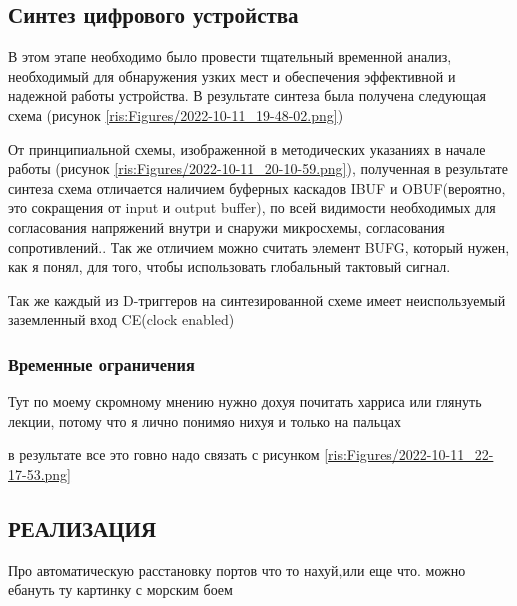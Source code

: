\begin{sloppypar}
\subsection{Синтез цифрового устройства} %
В этом этапе необходимо было провести тщательный временной анализ, необходимый для обнаружения узких мест и обеспечения эффективной и надежной работы устройства. 
В результате синтеза была получена следующая схема (рисунок \ref{ris:Figures/2022-10-11_19-48-02.png})


От принципиальной схемы, изображенной в методических указаниях в начале работы (рисунок \ref{ris:Figures/2022-10-11_20-10-59.png}), полученная в результате синтеза схема отличается наличием буферных каскадов IBUF и OBUF(вероятно, это сокращения от input и output buffer), по всей видимости необходимых для согласования напряжений внутри и снаружи микросхемы, согласования сопротивлений.. Так же отличием можно считать элемент BUFG, который нужен, как я понял, для того, чтобы использовать глобальный тактовый сигнал. 

Так же каждый из D-триггеров на синтезированной схеме имеет неиспользуемый заземленный вход CE(clock enabled)

\newpage
\subsubsection{Временные ограничения} %





Тут по моему скромному мнению нужно дохуя почитать харриса или глянуть лекции, потому что я лично понимяо нихуя и только на пальцах

в результате все это говно надо связать с рисунком \ref{ris:Figures/2022-10-11_22-17-53.png}



\newpage
\subsection{РЕАЛИЗАЦИЯ} %


Про автоматическую расстановку портов что то нахуй,или еще что. можно ебануть ту картинку с морским боем


\end{sloppypar}
